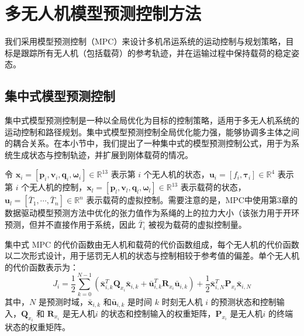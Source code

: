 \documentclass[lang=chs, degree=master, blindreview=false, winfonts=true]{yanputhesis}
\begin{document}

\section{多无人机模型预测控制方法}
我们采用模型预测控制（MPC）来设计多机吊运系统的运动控制与规划策略，目标是跟踪所有无人机（包括载荷）的参考轨迹，并在运输过程中保持载荷的稳定姿态。
\subsection{集中式模型预测控制}


集中式模型预测控制是一种以全局优化为目标的控制策略，适用于多无人机系统的运动控制和路径规划。集中式模型预测控制全局优化能力强，能够协调多主体之间的耦合关系。在本小节中，我们提出了一种集中式的模型预测控制公式，用于为系统生成状态与控制轨迹，并扩展到刚体载荷的情况。

令 \( \bm x_i = \left[ \bm p_i, \bm v_i, \bm q_i, \bm \omega_i \right] \in \mathbb{R}^{13} \) 表示第 \( i \) 个无人机的状态，\( \bm u_i = \left[ f_i, \bm \tau_i \right] \in \mathbb{R}^4 \) 表示第 \( i \) 个无人机的控制，\( \bm x_l = \left[ \bm p_l, \bm v_l, \bm q_l, \bm \omega_l \right] \in \mathbb{R}^{13} \) 表示载荷的状态，\( \bm u_l = \left[ \bar{T}_1, \cdots, \bar{T}_n \right] \in \mathbb{R}^n \) 表示载荷的虚拟控制。需要注意的是，MPC中使用第3章的数据驱动模型预测方法中优化的张力值作为系绳的上的拉力大小（该张力用于开环预测，但并不直接作用于系统，因此 \( \bar{T}_i \) 被视为载荷的虚拟控制量。

集中式 MPC 的代价函数由无人机和载荷的代价函数组成，每个无人机的代价函数以二次形式设计，用于惩罚无人机的状态与控制相较于参考值的偏差。单个无人机的代价函数表示为：
\begin{equation}
	J_i = \frac{1}{2}\sum_{k=0}^{N-1}\left(\bar{\boldsymbol{x}}_{i,k}^T\boldsymbol{Q}_{x_i}\bar{\boldsymbol{x}}_{i,k}+\bar{\boldsymbol{u}}_{i,k}^T\boldsymbol{R}_{x_i}\bar{\boldsymbol{u}}_{i,k}\right)+\frac{1}{2}\bar{\boldsymbol{x}}_{i,N}^T\boldsymbol{P}_{x_i}\bar{\boldsymbol{x}}_{i,N}
	\label{juav}
\end{equation}
其中，$N$ 是预测时域，$\bar{\boldsymbol{x}}_{i,k}$ 和$\bar{\boldsymbol{u}}_{i,k}$ 是时间 $k$ 时刻无人机 $i$ 的预测状态和控制输入，$\boldsymbol{Q}_{x_i}$ 和 $\boldsymbol{R}_{x_i}$ 是无人机$i$ 的状态和控制输入的权重矩阵，$\boldsymbol{P}_{x_i}$ 是无人机$i$ 的终端状态的权重矩阵。
\end{document}
